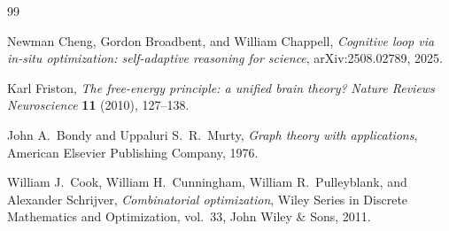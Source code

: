 \documentclass[12pt, a4paper]{article}
\theoremstyle{plain}
\theoremstyle{definition}
\theoremstyle{correspondence}
\begin{document}
\begin{thebibliography}{99}

Newman Cheng, Gordon Broadbent, and William Chappell,
\textit{Cognitive loop via in-situ optimization: self-adaptive reasoning for science},
arXiv:2508.02789, 2025.

Karl Friston,
\textit{The free-energy principle: a unified brain theory?}
\textit{Nature Reviews Neuroscience} \textbf{11} (2010), 127--138.

John A.~Bondy and Uppaluri S.~R.~Murty,
\textit{Graph theory with applications},
American Elsevier Publishing Company, 1976.

William J.~Cook, William H.~Cunningham, William R.~Pulleyblank, and Alexander Schrijver,
\textit{Combinatorial optimization},
Wiley Series in Discrete Mathematics and Optimization, vol.~33,
John Wiley \& Sons, 2011.

\end{thebibliography}
\end{document}
